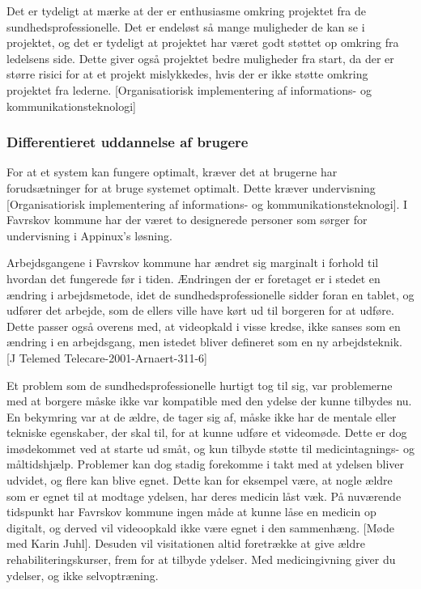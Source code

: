 Det er tydeligt at mærke at der er enthusiasme omkring projektet fra de sundhedsprofessionelle. Det er endeløst så mange muligheder de kan se i projektet, og det er tydeligt at projektet har været godt støttet op omkring fra ledelsens side. Dette giver også projektet bedre muligheder fra start, da der er større risici for at et projekt mislykkedes, hvis der er ikke støtte omkring projektet fra lederne. [Organisatiorisk implementering af informations- og kommunikationsteknologi] 

\subsubsection{Differentieret uddannelse af brugere}

For at et system kan fungere optimalt, kræver det at brugerne har forudsætninger for at bruge systemet optimalt. Dette kræver undervisning [Organisatiorisk implementering af informations- og kommunikationsteknologi]. I Favrskov kommune har der været to designerede personer som sørger for undervisning i Appinux’s løsning. 

Arbejdsgangene i Favrskov kommune har ændret sig marginalt i forhold til hvordan det fungerede før i tiden. Ændringen der er foretaget er i stedet en ændring i arbejdsmetode, idet de sundhedsprofessionelle sidder foran en tablet, og udfører det arbejde, som de ellers ville have kørt ud til borgeren for at udføre. Dette passer også overens med, at videopkald i visse kredse, ikke sanses som en ændring i en arbejdsgang, men istedet bliver defineret som en ny arbejdsteknik. [J Telemed Telecare-2001-Arnaert-311-6] 

Et problem som de sundhedsprofessionelle hurtigt tog til sig, var problemerne med at borgere måske ikke var kompatible med den ydelse der kunne tilbydes nu. En bekymring var at de ældre, de tager sig af, måske ikke har de mentale eller tekniske egenskaber, der skal til, for at kunne udføre et videomøde. Dette er dog imødekommet ved at starte ud småt, og kun tilbyde støtte til medicintagnings- og måltidshjælp. Problemer kan dog stadig forekomme i takt med at ydelsen bliver udvidet, og flere kan blive egnet. Dette kan for eksempel være, at nogle ældre som er egnet til at modtage ydelsen, har deres medicin låst væk. På nuværende tidspunkt har Favrskov kommune ingen måde at kunne låse en medicin op digitalt, og derved vil videoopkald ikke være egnet i den sammenhæng. [Møde med Karin Juhl]. Desuden vil visitationen altid foretrække at give ældre rehabiliteringskurser, frem for at tilbyde ydelser. Med medicingivning giver du ydelser, og ikke selvoptræning. 


